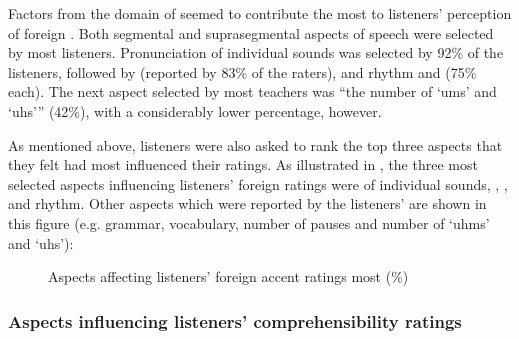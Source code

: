 \documentclass[output=paper]{langsci/langscibook}
\begin{document}
Factors from the domain of  seemed to contribute the most to listeners’ perception of foreign . Both segmental and suprasegmental aspects of speech were selected by most listeners. Pronunciation of individual sounds was selected by 92\% of the listeners, followed by  (reported by 83\% of the raters), and rhythm and  (75\% each). The next aspect selected by most teachers was “the number of ‘ums’ and ‘uhs’” (42\%), with a considerably lower percentage, however. 

As mentioned above, listeners were also asked to rank the top three aspects that they felt had most influenced their  ratings. As illustrated in , the three most selected aspects influencing listeners’ foreign  ratings were  of individual sounds, , , and rhythm. Other aspects which were reported by the listeners’ are shown in this figure (e.g. grammar, vocabulary, number of pauses and number of ‘uhms’ and ‘uhs’):

\begin{figure}
\caption{\label{fig:delrio:2} Aspects affecting listeners’ foreign accent ratings most (\%)}
\end{figure}
 

\clearpage 
\subsubsection{Aspects influencing listeners’ comprehensibility ratings}
\end{document}
